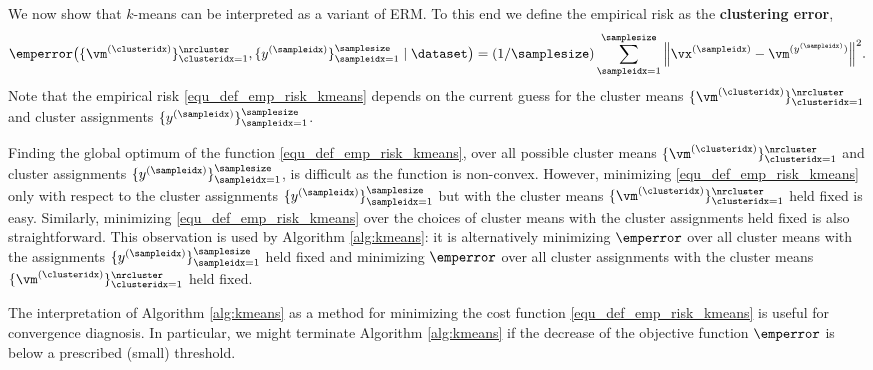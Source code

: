 \documentclass[12pt]{report}
\begin{document}
We now show that $k$-means can be interpreted as a variant of ERM. 
To this end we define the empirical risk as the {\bf clustering error}, 
\begin{equation}
\label{equ_def_emp_risk_kmeans}
\vspace*{-2mm}
 \emperror \big( \{\vm^{(\clusteridx)}\}_{\clusteridx=1}^{\nrcluster},\{y^{(\sampleidx)}\}_{\sampleidx=1}^{\samplesize} \mid \dataset \big)
=(1/\samplesize) \sum_{\sampleidx=1}^{\samplesize} {\left\|\vx^{(\sampleidx)}-\vm^{(y^{(\sampleidx)})}\right\|^2}.
\end{equation} 
Note that the empirical risk \eqref{equ_def_emp_risk_kmeans} depends 
on the current guess for the cluster means $\{ \vm^{(\clusteridx)} \}_{\clusteridx=1}^{\nrcluster}$ 
and cluster assignments $\{ y^{(\sampleidx)} \}_{\sampleidx=1}^{\samplesize}$. 

Finding the global optimum of the function \eqref{equ_def_emp_risk_kmeans}, 
over all possible cluster means $\{\vm^{(\clusteridx)}\}_{\clusteridx=1}^{\nrcluster}$ 
and cluster assignments $\{y^{(\sampleidx)}\}_{\sampleidx=1}^{\samplesize}$, 
is difficult as the function is non-convex. However, minimizing \eqref{equ_def_emp_risk_kmeans} 
only with respect to the cluster assignments $\{y^{(\sampleidx)}\}_{\sampleidx=1}^{\samplesize}$ 
but with the cluster means $\{\vm^{(\clusteridx)}\}_{\clusteridx=1}^{\nrcluster}$ 
held fixed is easy. Similarly, minimizing \eqref{equ_def_emp_risk_kmeans} over the 
choices of cluster means with the cluster assignments held fixed is also straightforward. 
This observation is used by Algorithm \ref{alg:kmeans}:  it is alternatively minimizing 
$\emperror$ over all cluster means with the assignments $\{ y^{(\sampleidx)} \}_{\sampleidx=1}^{\samplesize}$ 
held fixed and minimizing $\emperror$ over all cluster assignments with the 
cluster means $\{ \vm^{(\clusteridx)} \}_{\clusteridx=1}^{\nrcluster}$ held fixed. 

The interpretation of Algorithm \ref{alg:kmeans} as a method for 
minimizing the cost function \eqref{equ_def_emp_risk_kmeans} is 
useful for convergence diagnosis. In particular, we might terminate 
Algorithm \ref{alg:kmeans} if the decrease of the objective function 
$\emperror$ is below a prescribed (small) threshold. 
 
\end{document}
